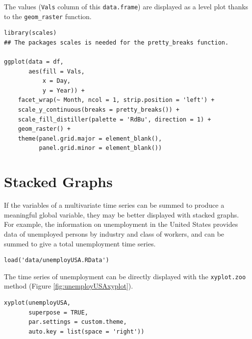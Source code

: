 \documentclass[smallroyalvopaper]{memoir}
\begin{document}
The values (\texttt{Vals} column of this \texttt{data.frame}) are displayed as a level plot thanks to the \texttt{geom\_raster} function.
\lstset{language=r,label= ,caption= ,captionpos=b,numbers=none}
\begin{lstlisting}
library(scales) 
## The packages scales is needed for the pretty_breaks function.

ggplot(data = df,
       aes(fill = Vals,
           x = Day,
           y = Year)) +
    facet_wrap(~ Month, ncol = 1, strip.position = 'left') +
    scale_y_continuous(breaks = pretty_breaks()) + 
    scale_fill_distiller(palette = 'RdBu', direction = 1) + 
    geom_raster() +
    theme(panel.grid.major = element_blank(),
          panel.grid.minor = element_blank())
\end{lstlisting}



\section{Stacked Graphs \label{sec:stacked}}
\label{sec:org652b770}
If the variables of a multivariate time series can be summed to
produce a meaningful global variable, they may be better displayed
with stacked graphs. For example, the information on unemployment in
the United States provides data of unemployed persons by industry and
class of workers, and can be summed to give a total unemployment time
series.

\lstset{language=r,label= ,caption= ,captionpos=b,numbers=none}
\begin{lstlisting}
load('data/unemployUSA.RData')
\end{lstlisting}

The time series of unemployment can be directly displayed
with the \texttt{xyplot.zoo} method (Figure \ref{fig:unemployUSAxyplot}).

\lstset{language=r,label= ,caption= ,captionpos=b,numbers=none}
\begin{lstlisting}
xyplot(unemployUSA,
       superpose = TRUE,
       par.settings = custom.theme,
       auto.key = list(space = 'right'))
\end{lstlisting}
\end{document}
